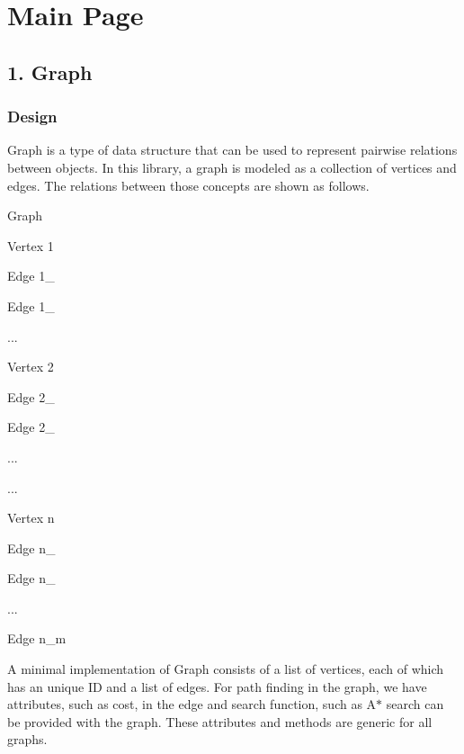 \hypertarget{md_mainpage_mainpage}{}\section{Main Page                         }\label{md_mainpage_mainpage}
\subsection*{1. Graph}

\subsubsection*{Design}

Graph is a type of data structure that can be used to represent pairwise relations between objects. In this library, a graph is modeled as a collection of vertices and edges. The relations between those concepts are shown as follows.
\begin{DoxyItemize}
\item Graph
\begin{DoxyItemize}
\item Vertex 1
\begin{DoxyItemize}
\item Edge 1\-\_
\item Edge 1\-\_
\item ...
\end{DoxyItemize}
\item Vertex 2
\begin{DoxyItemize}
\item Edge 2\-\_
\item Edge 2\-\_
\item ...
\end{DoxyItemize}
\item ...
\item Vertex n
\begin{DoxyItemize}
\item Edge n\-\_
\item Edge n\-\_
\item ...
\item Edge n\-\_\-m
\end{DoxyItemize}
\end{DoxyItemize}
\end{DoxyItemize}

A minimal implementation of Graph consists of a list of vertices, each of which has an unique I\-D and a list of edges. For path finding in the graph, we have attributes, such as cost, in the edge and search function, such as A$\ast$ search can be provided with the graph. These attributes and methods are generic for all graphs.

